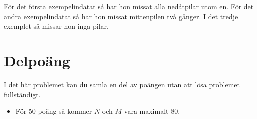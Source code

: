 För det första exempelindatat så har hon missat alla nedåtpilar utom
en. För det andra exempelindatat så har hon missat mittenpilen två
gånger. I det tredje exemplet så missar hon inga pilar.

\section*{Delpoäng}

I det här problemet kan du samla en del av poängen utan att
lösa problemet fullständigt.

\begin{itemize}
    \item För 50 poäng så kommer $N$ och $M$ vara maximalt 80.
\end{itemize}
